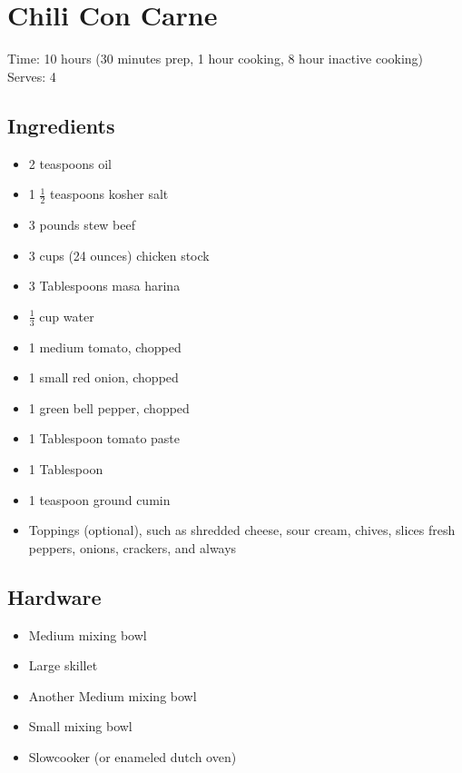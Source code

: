 \section{Chili Con Carne}
\label{chili}
\setcounter{secnumdepth}{0}
Time: 10 hours (30 minutes prep, 1 hour cooking, 8 hour inactive cooking)
Serves: 4

\begin{multicols}{2}
\subsection*{Ingredients}
\begin{itemize}
    \item 2 teaspoons oil
    \item 1 \( \frac{1}{2} \) teaspoons kosher salt
    \item 3 pounds stew beef
    \item 3 cups (24 ounces) chicken stock
    \item 3 Tablespoons masa harina
    \item \( \frac{1}{3} \) cup water
    \item 1 medium tomato, chopped
    \item 1 small red onion, chopped
    \item 1 green bell pepper, chopped
    \item 1 Tablespoon tomato paste
    \item 1 Tablespoon 
    \item 1 teaspoon ground cumin
    \item Toppings (optional), such as shredded cheese, sour cream, chives, slices fresh peppers, onions, crackers, and always 
\end{itemize}

\subsection*{Hardware}
\begin{itemize}
    \item Medium mixing bowl
    \item Large skillet
    \item Another Medium mixing bowl
    \item Small mixing bowl
    \item Slowcooker (or enameled dutch oven)
\end{itemize}
\clearpage


\end{multicols}
